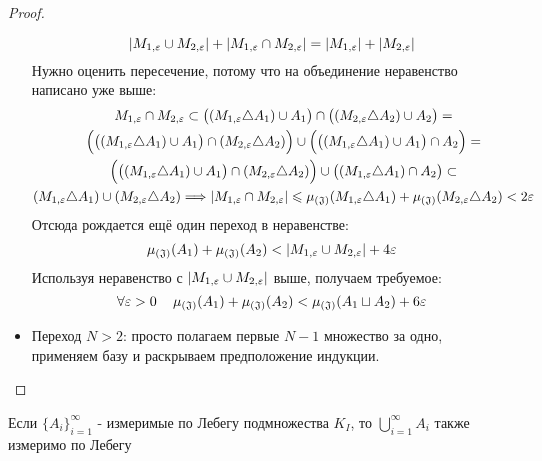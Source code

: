 \begin{proof}
\begin{itemize}
		\[
			|M_{1, \varepsilon} \cup M_{2, \varepsilon}| + |M_{1, \varepsilon} \cap M_{2, \varepsilon}| = |M_{1, \varepsilon}| + |M_{2, \varepsilon}|
		\]
		Нужно оценить пересечение, потому что на объединение неравенство написано уже выше:
		\begin{multline*}
			M_{1, \varepsilon} \cap M_{2, \varepsilon} \subset \big((M_{1, \varepsilon} \triangle A_1) \cup A_1\big) \cap \big((M_{2, \varepsilon} \triangle A_2) \cup A_2\big) =
			\\
			\Big(\big((M_{1, \varepsilon} \triangle A_1) \cup A_1\big) \cap (M_{2, \varepsilon} \triangle A_2)\Big) \cup \Big(\big((M_{1, \varepsilon} \triangle A_1) \cup A_1\big) \cap A_2\Big) =
			\\
			\Big(\big((M_{1, \varepsilon} \triangle A_1) \cup A_1\big) \cap (M_{2, \varepsilon} \triangle A_2)\Big) \cup \big((M_{1, \varepsilon} \triangle A_1) \cap A_2\big) \subset
			\\
			(M_{1, \varepsilon} \triangle A_1) \cup (M_{2, \varepsilon} \triangle A_2) \Longrightarrow |M_{1, \varepsilon} \cap M_{2, \varepsilon}| \leqslant \operatorname{\mu_{(\mathfrak{J})}}(M_{1, \varepsilon} \triangle A_1) + \operatorname{\mu_{(\mathfrak{J})}}(M_{2, \varepsilon} \triangle A_2) < 2\varepsilon
		\end{multline*}
		Отсюда рождается ещё один переход в неравенстве:
		\[
			\operatorname{\mu_{(\mathfrak{J})}}(A_1) + \operatorname{\mu_{(\mathfrak{J})}}(A_2) < |M_{1, \varepsilon} \cup M_{2, \varepsilon}| + 4\varepsilon
		\]
		Используя неравенство с $|M_{1, \varepsilon} \cup M_{2, \varepsilon}|$ выше, получаем требуемое:
		\[
			\forall \varepsilon > 0 \quad \operatorname{\mu_{(\mathfrak{J})}}(A_1) + \operatorname{\mu_{(\mathfrak{J})}}(A_2) < \operatorname{\mu_{(\mathfrak{J})}}(A_1 \sqcup A_2) + 6\varepsilon
		\]
		
		\item Переход $N > 2$: просто полагаем первые $N - 1$ множество за одно, применяем базу и раскрываем предположение индукции.
	\end{itemize}
\end{proof}

\begin{theorem}
	Если $\{A_i\}_{i = 1}^\infty$ - измеримые по Лебегу подмножества $K_I$, то $\bigcup_{i = 1}^\infty A_i$ также измеримо по Лебегу
\end{theorem}

